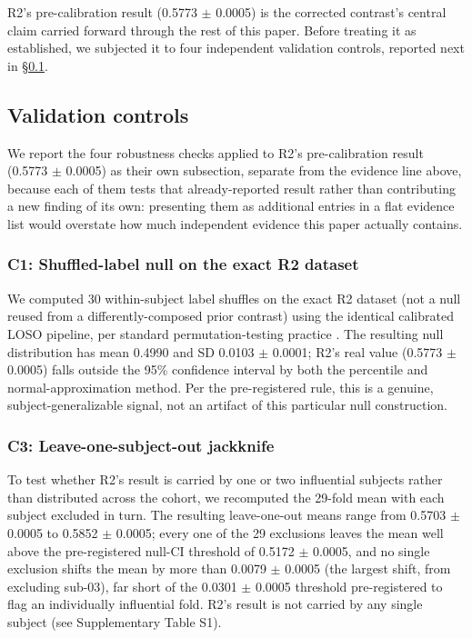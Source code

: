\documentclass[preprint,12pt]{elsarticle}
\begin{document}
R2's pre-calibration result (0.5773 $\pm$ 0.0005) is the corrected contrast's central claim carried forward through the rest of this paper. Before treating it as established, we subjected it to four independent validation controls, reported next in \S\ref{sec:validation}.

\subsection{Validation controls}\label{sec:validation}

We report the four robustness checks applied to R2's pre-calibration result (0.5773 $\pm$ 0.0005) as their own subsection, separate from the evidence line above, because each of them tests that already-reported result rather than contributing a new finding of its own: presenting them as additional entries in a flat evidence list would overstate how much independent evidence this paper actually contains.

\subsubsection{C1: Shuffled-label null on the exact R2 dataset}

We computed 30 within-subject label shuffles on the exact R2 dataset (not a null reused from a differently-composed prior contrast) using the identical calibrated LOSO pipeline, per standard permutation-testing practice \cite{nicholsholmes2002}. The resulting null distribution has mean 0.4990 and SD 0.0103 $\pm$ 0.0001; R2's real value (0.5773 $\pm$ 0.0005) falls outside the 95\% confidence interval by both the percentile and normal-approximation method. Per the pre-registered rule, this is a genuine, subject-generalizable signal, not an artifact of this particular null construction.

\subsubsection{C3: Leave-one-subject-out jackknife}

To test whether R2's result is carried by one or two influential subjects rather than distributed across the cohort, we recomputed the 29-fold mean with each subject excluded in turn. The resulting leave-one-out means range from 0.5703 $\pm$ 0.0005 to 0.5852 $\pm$ 0.0005; every one of the 29 exclusions leaves the mean well above the pre-registered null-CI threshold of 0.5172 $\pm$ 0.0005, and no single exclusion shifts the mean by more than 0.0079 $\pm$ 0.0005 (the largest shift, from excluding sub-03), far short of the 0.0301 $\pm$ 0.0005 threshold pre-registered to flag an individually influential fold. R2's result is not carried by any single subject (see Supplementary Table S1).
\end{document}
